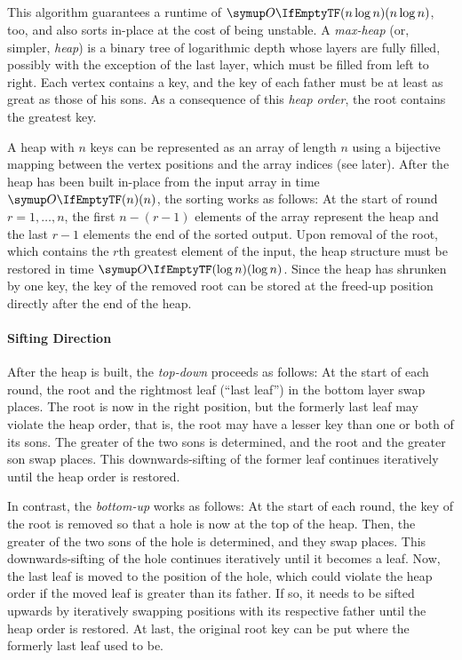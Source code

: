 \subsection{\texorpdfstring{\HS{}}{HeapSort}}
\label{subsec:tasklet:heap}

This algorithm guarantees a runtime of \(\bigoh{n \log n}\), too, and also sorts in-place at the cost of being unstable.
A \emph{max-heap} (or, simpler, \emph{heap}) is a binary tree of logarithmic depth whose layers are fully filled, possibly with the exception of the last layer, which must be filled from left to right.
Each vertex contains a key, and the key of each father must be at least as great as those of his sons.
As a consequence of this \emph{heap order}, the root contains the greatest key.

A heap with \(n\) keys can be represented as an array of length \(n\) using a bijective mapping between the vertex positions and the array indices (see later).
After the heap has been built in-place from the input array in time \(\bigoh{n}\), the sorting works as follows:
At the start of round \(r = 1, \dots, n\), the first \(n - (r - 1)\) elements of the array represent the heap and the last \(r - 1\) elements the end of the sorted output.
Upon removal of the root, which contains the \(r\)th greatest element of the input, the heap structure must be restored in time \(\bigoh{\log n}\).
Since the heap has shrunken by one key, the key of the removed root can be stored at the freed-up position directly after the end of the heap.

\paragraph{Sifting Direction}
After the heap is built, the \emph{top-down} \HS{} proceeds as follows:
At the start of each round, the root and the rightmost leaf (\enquote{last leaf}) in the bottom layer swap places.
The root is now in the right position, but the formerly last leaf may violate the heap order, that is, the root may have a lesser key than one or both of its sons.
The greater of the two sons is determined, and the root and the greater son swap places.
This downwards-sifting of the former leaf continues iteratively until the heap order is restored.

In contrast, the \emph{bottom-up} \HS{} \cite{wegener1993heapsort} works as follows:
At the start of each round, the key of the root is removed so that a hole is now at the top of the heap.
Then, the greater of the two sons of the hole is determined, and they swap places.
This downwards-sifting of the hole continues iteratively until it becomes a leaf.
Now, the last leaf is moved to the position of the hole, which could violate the heap order if the moved leaf is greater than its father.
If so, it needs to be sifted upwards by iteratively swapping positions with its respective father until the heap order is restored.
At last, the original root key can be put where the formerly last leaf used to be.

